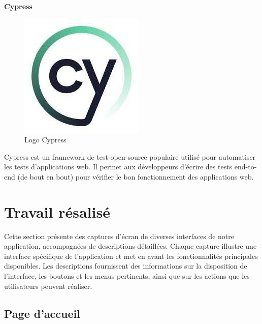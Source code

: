 \large
\textbf{Cypress}
\begin{figure}[htbp]
   \centering
   \includegraphics[scale=0.6]{Images/cy.jpg} 
   \caption{Logo Cypress}
   \label{fig:4D}
\end{figure}

Cypress est un framework de test open-source populaire utilisé 
pour automatiser les tests d’applications web. Il permet aux 
développeurs d’écrire des tests end-to-end (de bout en bout) pour 
vérifier le bon fonctionnement des applications web.

\section{Travail résalisé}
Cette section présente des captures d'écran de diverses interfaces de notre application, accompagnées de descriptions  détaillées.  Chaque  capture  illustre une interface spécifique de l'application et met en avant les fonctionnalités principales disponibles. Les descriptions fournissent des informations sur la disposition de l'interface, les boutons et les menus pertinents, ainsi que sur les actions que les utilisateurs peuvent réaliser.
\subsection{Page d'accueil}

